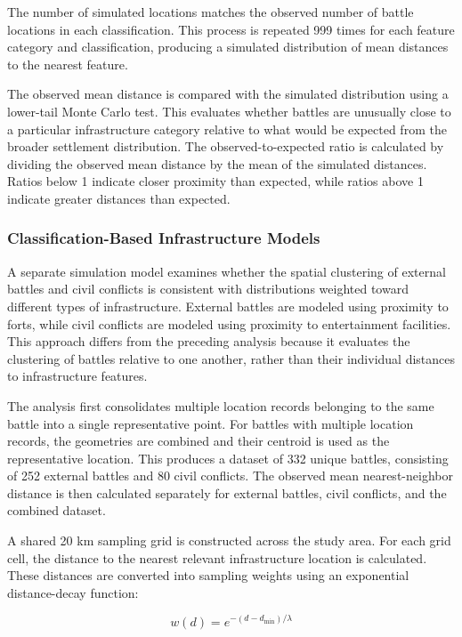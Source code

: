 \documentclass[
  letterpaper,
  DIV=11,
  numbers=noendperiod]{scrartcl}
\begin{document}
The number of simulated locations matches the observed number of battle
locations in each classification. This process is repeated 999 times for
each feature category and classification, producing a simulated
distribution of mean distances to the nearest feature.

The observed mean distance is compared with the simulated distribution
using a lower-tail Monte Carlo test. This evaluates whether battles are
unusually close to a particular infrastructure category relative to what
would be expected from the broader settlement distribution. The
observed-to-expected ratio is calculated by dividing the observed mean
distance by the mean of the simulated distances. Ratios below 1 indicate
closer proximity than expected, while ratios above 1 indicate greater
distances than expected.

\subsubsection{Classification-Based Infrastructure
Models}\label{classification-based-infrastructure-models}

A separate simulation model examines whether the spatial clustering of
external battles and civil conflicts is consistent with distributions
weighted toward different types of infrastructure. External battles are
modeled using proximity to forts, while civil conflicts are modeled
using proximity to entertainment facilities. This approach differs from
the preceding analysis because it evaluates the clustering of battles
relative to one another, rather than their individual distances to
infrastructure features.

The analysis first consolidates multiple location records belonging to
the same battle into a single representative point. For battles with
multiple location records, the geometries are combined and their
centroid is used as the representative location. This produces a dataset
of 332 unique battles, consisting of 252 external battles and 80 civil
conflicts. The observed mean nearest-neighbor distance is then
calculated separately for external battles, civil conflicts, and the
combined dataset.

A shared 20 km sampling grid is constructed across the study area. For
each grid cell, the distance to the nearest relevant infrastructure
location is calculated. These distances are converted into sampling
weights using an exponential distance-decay function:

\[
w(d) = e^{-(d-d_{\min})/\lambda}
\]
\end{document}
